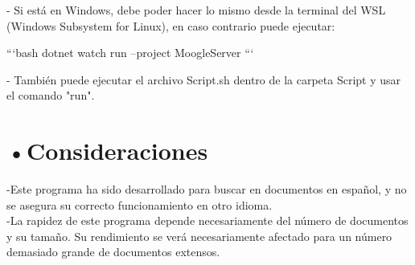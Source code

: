 \documentclass[aspectratio = 169, 14pt]{article}
\begin{document}
\begin{Large}
\begin{flushleft}
- Si está en Windows, debe poder hacer lo mismo desde la terminal del WSL (Windows Subsystem for Linux), en caso contrario puede ejecutar:

```bash\newline
dotnet watch run --project MoogleServer
```

- También puede ejecutar el archivo Script.sh dentro de la carpeta Script y usar el comando "run".

\end{flushleft}
\section{•Consideraciones}
-Este programa ha sido desarrollado para
buscar en documentos en español, y no se
asegura su correcto funcionamiento en otro
idioma.\\
\newline
-La rapidez de este programa depende
necesariamente del número de documentos y
su tamaño. Su rendimiento se
verá necesariamente afectado para un número demasiado
grande de documentos extensos.
\end{Large}
\end{document}
